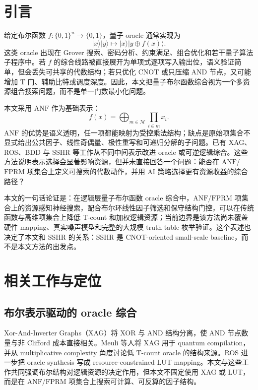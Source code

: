 \documentclass[UTF8,fontset=macnew,11pt]{ctexart}
\newcommand{\anf}{\ensuremath{\mathrm{ANF}}}
\newcommand{\fprm}{\ensuremath{\mathrm{FPRM}}}
\newcommand{\xor}{\ensuremath{\oplus}}
\newcommand{\ttable}{truth-table}
\begin{document}
\section{引言}

给定布尔函数 $f:\{0,1\}^n\rightarrow\{0,1\}$，量子 oracle 通常实现为
\begin{equation}
  |x\rangle |y\rangle \mapsto |x\rangle |y\xor f(x)\rangle .
  \label{eq:oracle}
\end{equation}
这类 oracle 出现在 Grover 搜索、密码分析、约束满足、组合优化和若干量子算法子程序中。若 $f$ 的综合线路被直接展开为单项式逐项写入输出位，语义验证简单，但会丢失可共享的代数结构；若只优化 CNOT 或只压缩 AND 节点，又可能增加 T 门、辅助比特或调度深度。因此，本文把量子布尔函数综合视为一个多资源组合搜索问题，而不是单一门数最小化问题。

本文采用 \anf{} 作为基础表示：
\begin{equation}
  f(x)=\bigoplus_{m\in\mathcal{M}}\prod_{i\in m}x_i .
  \label{eq:anf}
\end{equation}
\anf{} 的优势是语义透明，任一项都能映射为受控乘法结构；缺点是原始项集合不显式给出公共因子、线性奇偶量、极性重写和可递归分解的子问题。已有 XAG、ROS、BDD 与 SSHR 等工作从不同中间表示改进 oracle 或可逆逻辑综合\cite{meuli2022xag,meuli2020ros,wille2009bdd,zheng2025sshr}。这些方法说明表示选择会显著影响资源，但并未直接回答一个问题：能否在 \anf{}/\fprm{} 项集合上定义可搜索的代数动作，并用 AI 策略选择更有资源收益的综合路径？

本文的一句话论证是：在逻辑层量子布尔函数 oracle 综合中，\anf{}/\fprm{} 项集合上的资源感知神经搜索，配合布尔环线性因子筛选和保守结构门控，可以在传统函数与高维项集合上降低 T-count 和加权逻辑资源；当前边界是该方法尚未覆盖硬件 mapping、真实噪声模型和完整的大规模 \ttable{} 枚举验证。这个表述也决定了本文和 SSHR 的关系：SSHR 是 CNOT-oriented small-scale baseline，而不是本文方法的出发点。

\section{相关工作与定位}

\subsection{布尔表示驱动的 oracle 综合}

Xor-And-Inverter Graphs（XAG）将 XOR 与 AND 结构分离，使 AND 节点数量与非 Clifford 成本直接相关。Meuli 等人将 XAG 用于 quantum compilation\cite{meuli2022xag}，并从 multiplicative complexity 角度讨论低 T-count oracle 的结构来源\cite{meuli2019multiplicative}。ROS 进一步把 oracle synthesis 写成 resource-constrained LUT mapping\cite{meuli2020ros}。本文与这些工作共同强调布尔结构对逻辑资源的决定作用，但本文不固定使用 XAG 或 LUT，而是在 \anf{}/\fprm{} 项集合上搜索可计算、可反算的因子结构。
\end{document}
